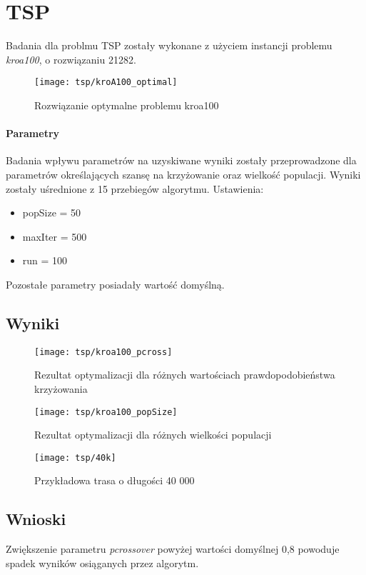 \section{TSP}

Badania dla problmu TSP zostały wykonane z użyciem instancji problemu \textit{kroa100}, o rozwiązaniu 21282. 


\begin{figure}[H]
	\centering
	\texttt{[image: tsp/kroA100\_optimal]}
	\caption{Rozwiązanie optymalne problemu kroa100}
\end{figure}

\paragraph{Parametry}
Badania wpływu parametrów na uzyskiwane wyniki zostały przeprowadzone dla parametrów określających szansę na krzyżowanie oraz wielkość populacji. Wyniki zostały uśrednione z 15 przebiegów algorytmu. Ustawienia: 

\begin{itemize}
	\item popSize = 50
	\item maxIter = 500
	\item run = 100
\end{itemize}

Pozostałe parametry posiadały wartość domyślną.

\subsection{Wyniki}

\begin{figure}[H]
	\centering
	\texttt{[image: tsp/kroa100\_pcross]}
	\caption{Rezultat optymalizacji dla różnych wartościach prawdopodobieństwa krzyżowania}
\end{figure}

\begin{figure}[H]
	\centering
	\texttt{[image: tsp/kroa100\_popSize]}
	\caption{Rezultat optymalizacji dla różnych wielkości populacji}
\end{figure}

\begin{figure}[H]
	\centering
	\texttt{[image: tsp/40k]}
	\caption{Przykładowa trasa o długości 40 000}
\end{figure}

\subsection{Wnioski}
Zwiększenie parametru \textit{pcrossover} powyżej wartości domyślnej 0,8 powoduje spadek wyników osiąganych przez algorytm.

